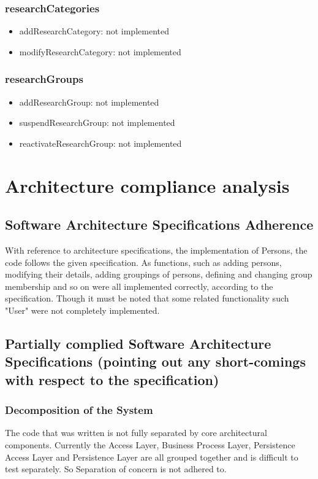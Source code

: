 \documentclass{article}
\begin{document}
	\subsubsection{researchCategories}
	\begin{itemize}
		\item addResearchCategory: not implemented
		\item modifyResearchCategory: not implemented
	\end{itemize}
	
	\subsubsection{researchGroups}
	\begin{itemize}
		\item addResearchGroup: not implemented
		\item suspendResearchGroup: not implemented
		\item reactivateResearchGroup: not implemented
	\end{itemize}
	
	\newpage
	
	\section{Architecture compliance analysis}
	\subsection{Software Architecture Specifications Adherence}
	With reference to architecture specifications, the implementation of Persons, the code follows the given specification. As functions, such as adding persons, modifying their details, adding groupings of persons, defining and changing group membership and so on were all implemented correctly, according to the specification. Though it must be noted that some related functionality such "User" were not completely implemented.
	
	\subsection{Partially complied Software Architecture Specifications (pointing out any short-comings with respect to the specification)}
	
	\subsubsection{Decomposition of the System}
	The code that was written is not fully separated by core architectural components. Currently the Access Layer, Business Process Layer, Persistence Access Layer and Persistence Layer are all grouped together and is difficult to test separately. So Separation of concern is not adhered to.
	
\end{document}
